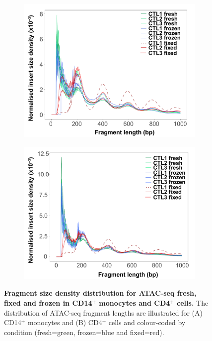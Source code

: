 \begin{figure}[htbp]
\centering
\begin{subfigure}{0.5\textwidth}
\centering
\includegraphics[width=\textwidth]{./Results1/pdfs/Core_ATAC_CD14_fresh_frozen_fixed_frag_size_distribution}
\caption{\textbf{}}
\end{subfigure}%
\begin{subfigure}{0.5\textwidth}
\centering
\includegraphics[width=\textwidth]{./Results1/pdfs/Core_ATAC_CD4_fresh_frozen_fixed_frag_size_distribution}
\caption{\textbf{}}
\end{subfigure}
\caption[Fragment size density distribution for ATAC-seq fresh, fixed and frozen in CD14$^+$ monocytes and CD4$^+$ cells.]{\textbf{Fragment size density distribution for ATAC-seq fresh, fixed and frozen in CD14$^+$ monocytes and CD4$^+$ cells.} The distribution of ATAC-seq fragment lengths are illustrated for (A) CD14$^+$ monocytes and (B) CD4$^+$ cells and colour-coded by condition (fresh=green, frozen=blue and fixed=red).}
\label{figure:Core_ATAC_all_fragment_size_distribution}
\end{figure} 


